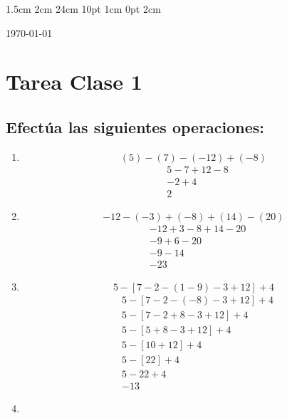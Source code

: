 \documentclass[12pt,letterpaper]{report}
\begin{document}
\setmargins{2.5cm}      
{1.5cm}                     
{2cm}  
{24cm}                    
{10pt}                          
{1cm}                          
{0pt}                             
{2cm}
\begin{flushright}
\today
\end{flushright}
\vspace{-1.75cm}
\section*{Tarea Clase 1}
\subsection*{Efectúa las siguientes operaciones:}
\begin{enumerate}
    \item \begin{equation*}
    (5)-(7)-(-12)+(-8)
    \end{equation*}
    \begin{align*}
        &5-7+12-8\\
        &-2+4\\
        &2
    \end{align*}
        \item \begin{equation*}
        -12-(-3)+(-8)+(14)-(20)
    \end{equation*}
    \begin{align*}
        &-12+3-8+14-20\\
        &-9+6-20\\
        &-9-14\\
        &-23
    \end{align*}
        \item \begin{equation*}
        5-[7-2-(1-9)-3+12]+4
    \end{equation*}
    \begin{align*}
        &5-[7-2-(-8)-3+12]+4\\
        &5-[7-2+8-3+12]+4\\
        &5-[5+8-3+12]+4\\
        &5-[10+12]+4\\
        &5-[22]+4\\
        &5-22+4\\
        &-13
    \end{align*}
    \item \begin{equation*}

\end{equation*}
\end{enumerate}
\end{document}
